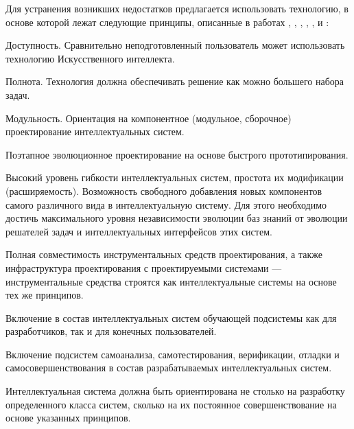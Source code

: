 \begin{partbacktext}
Для устранения возникших недостатков предлагается использовать технологию, в основе которой лежат следующие принципы, описанные в работах , , , , ,  и :
\begin{textitemize}
	\item Доступность. Сравнительно неподготовленный пользователь может использовать технологию Искусственного интеллекта.
	\item Полнота. Технология должна обеспечивать решение как можно большего набора задач.
	\item Модульность. Ориентация на компонентное (модульное, сборочное) проектирование интеллектуальных систем.
	\item Поэтапное эволюционное проектирование на основе быстрого прототипирования.
	\item Высокий уровень гибкости интеллектуальных систем, простота их модификации (расширяемость). Возможность свободного добавления новых компонентов самого различного вида в интеллектуальную систему. Для этого необходимо достичь максимального уровня независимости эволюции баз знаний от эволюции решателей задач и интеллектуальных интерфейсов этих систем.
	\item Полная совместимость инструментальных средств проектирования, а также инфраструктура проектирования с проектируемыми системами --- инструментальные средства строятся как интеллектуальные системы на основе тех же принципов.
	\item Включение в состав интеллектуальных систем обучающей подсистемы как для разработчиков, так и для конечных пользователей.
	\item Включение подсистем самоанализа, самотестирования, верификации, отладки и самосовершенствования в состав разрабатываемых интеллектуальных систем.
\end{textitemize}

Интеллектуальная система должна быть ориентирована не столько на разработку определенного класса систем, сколько на их постоянное совершенствование на основе указанных принципов.


\end{partbacktext}
